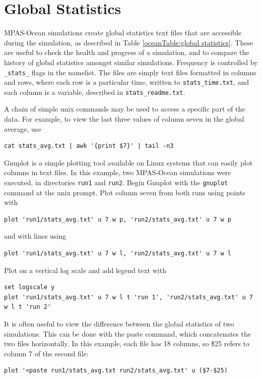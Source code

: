 \chapter{Global Statistics}
\label{chap:global_statistics}

MPAS-Ocean simulations create global statistics text files that are accessible during the simulation, as described in Table \ref{oceanTable:global statistics}.  These are useful to check the health and progress of a simulation, and to compare the history of global statistics amongst similar simulations.  Frequency is controlled by \verb|_stats_| flags in the namelist.  The files are simply text files formatted in columns and rows, where each row is a particular time, written to \verb|stats_time.txt|, and each column is a variable, described in \verb|stats_readme.txt|.

A chain of simple unix commands may be used to access a specific part of the data.  For example, to view the last three values of column seven in the global average, use
\begin{verbatim}
cat stats_avg.txt | awk '{print $7}' | tail -n3
\end{verbatim}
Gnuplot is a simple plotting tool available on Linux systems that can easily plot columns in text files.  In this example, two MPAS-Ocean simulations were executed, in directories \verb|run1| and \verb|run2|.  Begin Gnuplot with the \verb|gnuplot| command at the unix prompt.  Plot column seven from both runs using points with
\begin{verbatim}
plot 'run1/stats_avg.txt' u 7 w p, 'run2/stats_avg.txt' u 7 w p
\end{verbatim}
and with lines using
\begin{verbatim}
plot 'run1/stats_avg.txt' u 7 w l, 'run2/stats_avg.txt' u 7 w l
\end{verbatim}
Plot on a vertical log scale and add legend text with
\begin{verbatim}
set logscale y
plot 'run1/stats_avg.txt' u 7 w l t 'run 1', 'run2/stats_avg.txt' u 7 w l t 'run 2'
\end{verbatim}
It is often useful to view the difference between the global statistics of two simulations.  This can be done with the paste command, which concatenates the two files horizontally.  In this example, each file has 18 columns, so \$25 refers to column 7 of the second file:
\begin{verbatim}
plot '<paste run1/stats_avg.txt run2/stats_avg.txt' u ($7-$25)
\end{verbatim}

